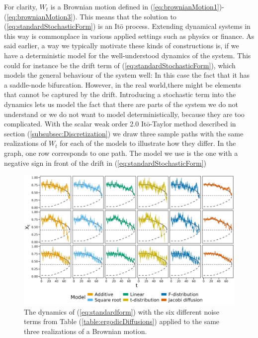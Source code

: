 For clarity, $W_t$ is a Brownian motion defined in (\ref{eq:brownianMotion1})-(\ref{eq:brownianMotion3}). This means that the solution to (\ref{eq:standardStochasticForm}) is an Itō process. Extending dynamical systems in this way is commonplace in various applied settings such as physics or finance. As said earlier, a way we typically motivate these kinds of constructions is, if we have a deterministic model for the well-understood dynamics of the system. This could for instance be the drift term of (\ref{eq:standardStochasticForm}), which models the general behaviour of the system well: In this case the fact that it has a saddle-node bifurcation. However, in the real world,there might be elements that cannot be captured by the drift. Introducing a stochastic term into the dynamics lets us model the fact that there are parts of the system we do not understand or we do not want to model deterministically, because they are too complicated.\newpage
\noindent With the scalar weak order 2.0 Itō-Taylor method described in section (\ref{subsubsec:Discretization}) we draw three sample paths with the same realizations of $W_t$ for each of the models to illustrate how they differ. In the graph, one row corresponds to one path. The model we use is the one with a negative sign in front of the drift in (\ref{eq:standardStochasticForm})
\begin{figure}[h]
    \begin{center}
        \includegraphics[scale = .1]{figures/sample_paths_plot_small_scale.jpeg}
        \caption{The dynamics of (\ref{eq:standardform}) with the six different noise terms from Table (\ref{table:ergodicDiffusions}) applied to the same three realizations of a Brownian motion.}
        \label{figure:samplesFromAllDifferentModels}
    \end{center}
\end{figure}\\
